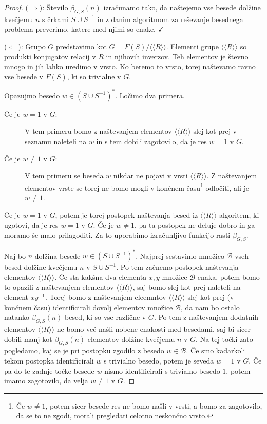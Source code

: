 \documentclass[11pt]{book}
\renewcommand{\llangle}{\langle\langle}
\renewcommand{\rrangle}{\rangle\rangle}
\def\kljuka{$\checkmark$}
\theoremstyle{definition}
\theoremstyle{zgled}
\theoremstyle{odprtproblem}
\theoremstyle{domacanaloga}
\newenvironment{dokaz}
    {\color{siva}\begin{proof}}
    {\end{proof}}
\theoremstyle{izrek}
\begin{document}
\begin{dokaz}
\underline{($\Rightarrow$):} Število $\beta_{G,S}(n)$ izračunamo tako, da naštejemo vse besede dolžine kvečjemu $n$ s črkami $S \cup S^{-1}$ in z danim algoritmom za reševanje besednega problema preverimo, katere med njimi so enake. \kljuka

\underline{($\Leftarrow$):} Grupo $G$ predstavimo kot $G = F(S)/\llangle R \rrangle$. Elementi grupe $\llangle R \rrangle$ so produkti konjugatov relacij v $R$ in njihovih inverzov. Teh elementov je števno mnogo in jih lahko uredimo v vrsto. Ko beremo to vrsto, torej naštevamo ravno vse besede v $F(S)$, ki so trivialne v $G$.

Opazujmo besedo $w \in (S \cup S^{-1})^*$. Ločimo dva primera.
\begin{description}
    \item[Če je $w=1$ v $G$:] V tem primeru bomo z naštevanjem elementov $\llangle R \rrangle$ slej kot prej v seznamu naleteli na $w$ in s tem dobili zagotovilo, da je res $w = 1$ v $G$.
    \item[Če je $w \neq 1$ v $G$:] V tem primeru se beseda $w$ nikdar ne pojavi v vrsti $\llangle R \rrangle$. Z naštevanjem elementov vrste se torej ne bomo mogli v končnem času\footnote{Če $w \neq 1$, potem sicer besede res ne bomo našli v vrsti, a bomo za zagotovilo, da se to ne zgodi, morali pregledati celotno neskončno vrsto.} odločiti, ali je $w \neq 1$.
\end{description}
Če je $w = 1$ v $G$, potem je torej postopek naštevanja besed iz $\llangle R \rrangle$ algoritem, ki ugotovi, da je res $w = 1$ v $G$. Če je $w \neq 1$, pa ta postopek ne deluje dobro in ga moramo še malo prilagoditi. Za to uporabimo izračunljivo funkcijo rasti $\beta_{G,S}$.

Naj bo $n$ dolžina besede $w \in (S \cup S^{-1})^*$. Najprej sestavimo množico $\mathcal{B}$ vseh besed dolžine kvečjemu $n$ v $S \cup S^{-1}$. Po tem začnemo postopek naštevanja elementov $\llangle R \rrangle$. Če sta kakšna dva elementa 
$x,y$ množice $\mathcal{B}$ enaka, potem bomo to opazili z naštevanjem elementov $\llangle R \rrangle$, saj bomo slej kot prej naleteli na element $x y^{-1}$. Torej bomo z naštevanjem eleemntov $\llangle R \rrangle$ slej kot prej (v končnem času) identificirali dovolj elementov množice $\mathcal{B}$, da nam bo ostalo natanko $\beta_{G,S}(n)$ besed, ki so vse različne v $G$. Po tem z naštevanjem dodatnih elementov $\llangle R \rrangle$ ne bomo več našli nobene enakosti med besedami, saj bi sicer dobili manj kot $\beta_{G,S}(n)$ elementov dolžine kvečjemu $n$ v $G$. Na tej točki zato pogledamo, kaj se je pri postopku zgodilo z besedo $w \in \mathcal{B}$. Če smo kadarkoli tekom postopka identificirali $w$ s trivialno besedo, potem je seveda $w = 1$ v $G$. Če pa do te zadnje točke besede $w$ nismo identificirali s trivialno besedo $1$, potem imamo zagotovilo, da velja $w \neq 1$ v $G$. 
\end{dokaz}
\end{document}
